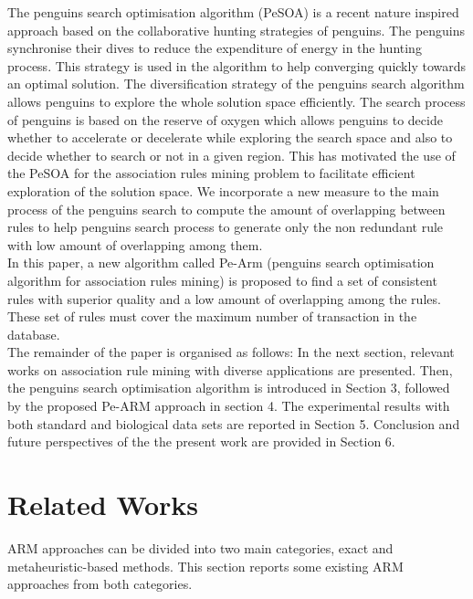 \documentclass[preprint,12pt]{elsarticle}
\begin{document}
The penguins search optimisation algorithm (PeSOA) \cite{15} is a recent nature inspired approach based on the collaborative hunting strategies of penguins. The penguins synchronise their dives to reduce the expenditure of energy in the hunting process. This strategy is used in the algorithm to help converging quickly towards an optimal solution. The diversification strategy of the penguins search algorithm allows penguins to explore  the whole solution space efficiently. The search process of penguins is based on the reserve of oxygen which allows penguins to decide whether to accelerate or decelerate while exploring the search space and also to decide whether to search or not in a given region. This has motivated the use of the PeSOA for the association rules mining problem to facilitate efficient exploration of the solution space. We incorporate a new measure to the main process of the penguins search to compute the amount of overlapping between rules to help penguins search process to generate only the non redundant rule with low amount of overlapping among them. \\
In this paper, a new algorithm called Pe-Arm (penguins search optimisation algorithm for association rules mining) is proposed  to find a set of consistent rules with superior quality and a low amount of overlapping among the rules. These set of rules must cover the maximum number of transaction in the database.\\
The remainder of the paper is organised as follows: In the next section, relevant works on association rule mining with diverse applications are presented. 
Then, the penguins search optimisation algorithm is introduced in Section 3, 
followed by the proposed Pe-ARM approach   in section 4. 
The experimental results with both standard and biological data sets are reported in Section 5. 
Conclusion and future perspectives of the the present work are provided in Section 6.
\section{Related Works}
ARM approaches can be divided into two main categories, exact and metaheuristic-based methods.
This section reports some existing ARM approaches from both categories.
\end{document}
